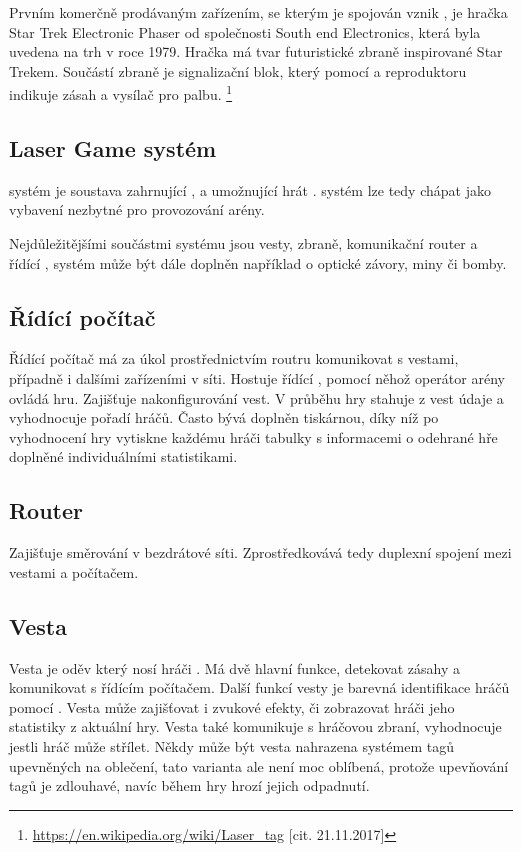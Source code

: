 Prvním komerčně prodávaným zařízením, se kterým je spojován vznik , je hračka Star Trek Electronic Phaser od společnosti South end Electronics, která byla uvedena na trh v roce 1979. Hračka má tvar futuristické zbraně inspirované Star Trekem. Součástí zbraně je signalizační blok, který pomocí  a reproduktoru indikuje zásah a  vysílač pro palbu.
\footnote{\url{https://en.wikipedia.org/wiki/Laser_tag} [cit. 21.11.2017]}

\subsection{Laser Game systém}
 systém je soustava zahrnující ,  a  umožnující hrát .  systém lze tedy chápat jako vybavení nezbytné pro provozování  arény.

Nejdůležitějšími součástmi  systému jsou vesty, zbraně, komunikační router a řídící ,  systém může být dále doplněn například o optické závory, miny či bomby.

\subsection{Řídící počítač}
Řídící počítač má za úkol prostřednictvím routru komunikovat s vestami, případně i dalšími zařízeními v síti. Hostuje řídící , pomocí něhož operátor arény ovládá hru. Zajišťuje nakonfigurování vest. V průběhu hry stahuje z vest údaje a vyhodnocuje pořadí hráčů. Často bývá doplněn tiskárnou, díky níž po vyhodnocení hry vytiskne každému hráči tabulky s informacemi o odehrané hře doplněné individuálními statistikami.

\subsection{Router}
Zajišťuje směrování v bezdrátové  síti. Zprostředkovává tedy duplexní spojení mezi vestami a počítačem.

\subsection{Vesta}
Vesta je oděv který nosí hráči . Má dvě hlavní funkce, detekovat zásahy a komunikovat s řídícím počítačem. Další funkcí vesty je barevná identifikace hráčů pomocí  . Vesta může zajišťovat i zvukové efekty, či zobrazovat hráči jeho statistiky z aktuální hry. Vesta také komunikuje s hráčovou zbraní, vyhodnocuje jestli hráč může střílet. Někdy může být vesta nahrazena systémem tagů upevněných na oblečení, tato varianta ale není moc oblíbená, protože upevňování tagů je zdlouhavé, navíc během hry hrozí jejich odpadnutí.

